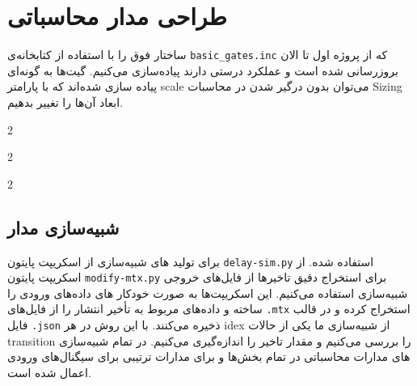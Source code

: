 \section{طراحی مدار محاسباتی}


ساختار فوق را با استفاده از کتابخانه‌ی \texttt{basic\_gates.inc} که از پروژه اول تا الان بروزرسانی شده است و عملکرد درستی دارند پیاده‌سازی می‌کنیم.
گیت‌ها به گونه‌ای پیاده سازی شده‌اند که با پارامتر scale می‌توان بدون درگیر شدن در محاسبات Sizing ابعاد آن‌ها را تغییر بدهیم.


\begin{multicols}{2}
\end{multicols}

\begin{multicols}{2}
\end{multicols}

\begin{multicols}{2}
\end{multicols}


\subsection{شبیه‌سازی مدار}


برای تولید های شبیه‌سازی از اسکریپت پایتون \texttt{delay-sim.py} استفاده شده.
از اسکریپت‌ پایتون \texttt{modify-mtx.py} برای استخراج دقیق تاخیرها از فایل‌های خروجی شبیه‌سازی استفاده می‌کنیم. این اسکریپت‌ها به صورت خودکار های داده‌های ورودی را ساخته و داده‌های مربوط به تأخیر انتشار  را از فایل‌های \texttt{.mtx} استخراج کرده و در قالب فایل \texttt{.json} ذخیره می‌کنند.
با این روش در هر idex از شبیه‌سازی ما یکی از حالات transition را بررسی می‌کنیم و مقدار تاخیر را اندازه‌گیری می‌کنیم.
در تمام شبیه‌سازی های مدارات محاسباتی در تمام بخش‌ها   و برای مدارات ترتیبی  برای سیگنال‌های ورودی اعمال شده است.

